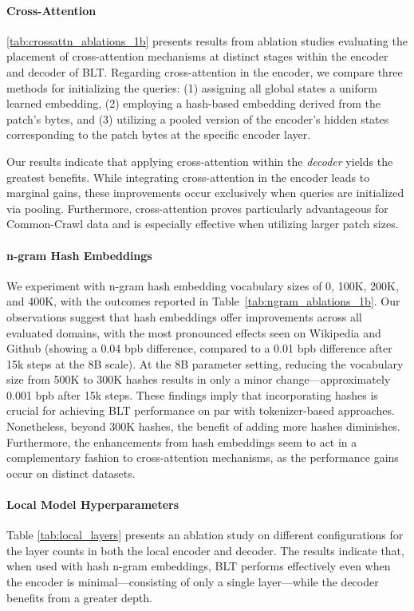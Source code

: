 \paragraph{Cross-Attention}
\autoref{tab:crossattn_ablations_1b} presents results from ablation studies evaluating the placement of cross-attention mechanisms at distinct stages within the encoder and decoder of {\textsc BLT}. Regarding cross-attention in the encoder, we compare three methods for initializing the queries: (1) assigning all global states a uniform learned embedding, (2) employing a hash-based embedding derived from the patch’s bytes, and (3) utilizing a pooled version of the encoder’s hidden states corresponding to the patch bytes at the specific encoder layer.

Our results indicate that applying cross-attention within the \textit{decoder} yields the greatest benefits. While integrating cross-attention in the encoder leads to marginal gains, these improvements occur exclusively when queries are initialized via pooling. Furthermore, cross-attention proves particularly advantageous for Common-Crawl data and is especially effective when utilizing larger patch sizes.

\paragraph{n-gram Hash Embeddings} 

We experiment with n-gram hash embedding vocabulary sizes of 0, 100K, 200K, and 400K, with the outcomes reported in Table~\ref{tab:ngram_ablations_1b}. Our observations suggest that hash embeddings offer improvements across all evaluated domains, with the most pronounced effects seen on Wikipedia and Github (showing a 0.04 bpb difference, compared to a 0.01 bpb difference after 15k steps at the 8B scale). At the 8B parameter setting, reducing the vocabulary size from 500K to 300K hashes results in only a minor change—approximately 0.001 bpb after 15k steps. These findings imply that incorporating hashes is crucial for achieving {\textsc BLT} performance on par with tokenizer-based approaches. Nonetheless, beyond 300K hashes, the benefit of adding more hashes diminishes. Furthermore, the enhancements from hash embeddings seem to act in a complementary fashion to cross-attention mechanisms, as the performance gains occur on distinct datasets.

\paragraph{Local Model Hyperparameters} Table \ref{tab:local_layers} presents an ablation study on different configurations for the layer counts in both the local encoder and decoder. The results indicate that, when used with hash n-gram embeddings, {\textsc BLT} performs effectively even when the encoder is minimal—consisting of only a single layer—while the decoder benefits from a greater depth.


